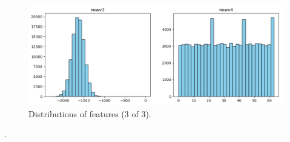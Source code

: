 \documentclass[10pt,twocolumn]{article}
\begin{document}
\begin{figure}[H]
    \centering
    \includegraphics[width=0.85\linewidth]{distribution_3.png}
    \caption{Distributions of features (3 of 3).}
    \label{fig:distribution-3}
\end{figure}







\cite{dryad_tabletennis2021}.

\printbibliography
\end{document}
